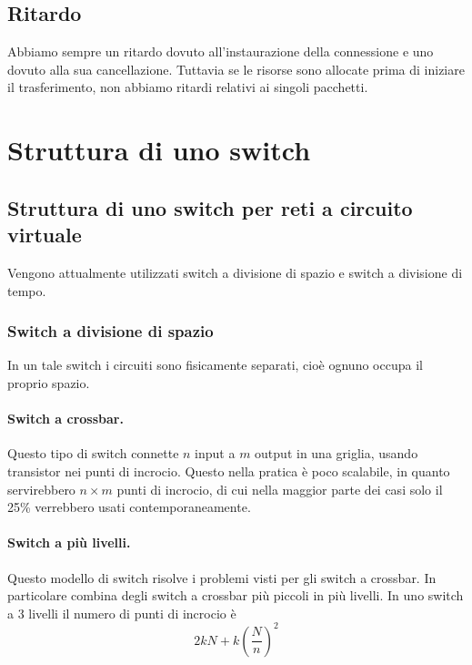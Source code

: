     \subsection{Ritardo}
        Abbiamo sempre un ritardo dovuto all'instaurazione della connessione e uno dovuto alla sua cancellazione. Tuttavia se le risorse sono allocate prima di iniziare il trasferimento, non abbiamo ritardi relativi ai singoli pacchetti.
        
\section{Struttura di uno switch}
    \subsection{Struttura di uno switch per reti a circuito virtuale}
        Vengono attualmente utilizzati switch a divisione di spazio e switch a divisione di tempo.
        
        \subsubsection{Switch a divisione di spazio}
            In un tale switch i circuiti sono fisicamente separati, cioè ognuno occupa il proprio spazio.
            
            \paragraph{Switch a crossbar.} Questo tipo di switch connette $n$ input a $m$ output in una griglia, usando transistor nei punti di incrocio. Questo nella pratica è poco scalabile, in quanto servirebbero $n \times m$ punti di incrocio, di cui nella maggior parte dei casi solo il 25\% verrebbero usati contemporaneamente.
            
            \paragraph{Switch a più livelli.} Questo modello di switch risolve i problemi visti per gli switch a crossbar. In particolare combina degli switch a crossbar più piccoli in più livelli. In uno switch a 3 livelli il numero di punti di incrocio è
            \begin{equation*}
                2kN + k\left(\frac{N}{n}\right)^2
            \end{equation*}
            
